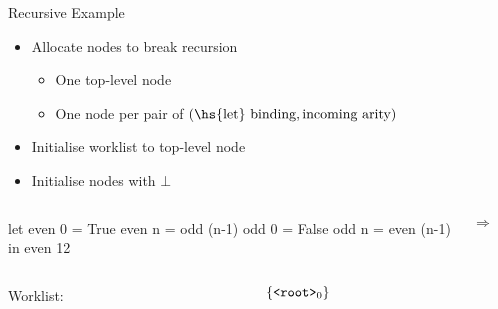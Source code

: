 \documentclass{haskellbeamer}
\begin{document}
\begin{frame}[fragile]{Recursive Example}
  \begin{itemize}
    \item Allocate nodes to break recursion
      \begin{itemize}
        \item One top-level node
        \item One node per pair of $(\text{\hs{let} binding}, \text{incoming arity})$
      \end{itemize}
    \item Initialise worklist to top-level node
    \item Initialise nodes with $\bot$
  \end{itemize}
  \begin{overprint}
    \begin{columns}
      \begin{column}{0.35\textwidth}
        \begin{haskell}
          let even 0 = True
              even n = odd (n-1)
              odd 0 = False
              odd n = even (n-1)
          in even 12
        \end{haskell}
      \end{column}
      \begin{column}{0.02\textwidth}
        {\Huge$\Rightarrow$}
      \end{column}
      \begin{column}{0.4\textwidth}
      \end{column}
    \end{columns}
    \begin{columns}
      \begin{column}{0.55\textwidth}
        \hfill Worklist:
      \end{column}
      \begin{column}{0.55\textwidth}
        $\{\text{$\text{\texttt{<root>}}_{0}$}\}$ \hfill
      \end{column}
    \end{columns}
  \end{overprint}
\end{frame}
\end{document}
